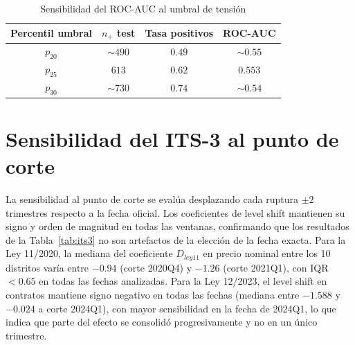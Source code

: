\documentclass[12pt,a4paper]{article}
\begin{document}
\begin{table}[H]
\caption{Sensibilidad del ROC-AUC al umbral de tensión}
\label{tab:umbral}
\centering
\small
\begin{tabular}{cccc}
\toprule
Percentil umbral & $n_{+}$ test & Tasa positivos & ROC-AUC \\
\midrule
$p_{20}$ & $\sim 490$ & $0.49$ & $\sim 0.55$ \\
$p_{25}$ & $613$      & $0.62$ & $0.553$      \\
$p_{30}$ & $\sim 730$ & $0.74$ & $\sim 0.54$ \\
\bottomrule
\end{tabular}
\end{table}

\section{Sensibilidad del ITS-3 al punto de corte}
\label{app:its_robustez}

La sensibilidad al punto de corte se evalúa desplazando cada ruptura $\pm 2$
trimestres respecto a la fecha oficial. Los coeficientes de level shift mantienen
su signo y orden de magnitud en todas las ventanas, confirmando que los resultados
de la Tabla~\ref{tab:its3} no son artefactos de la elección de la fecha exacta.
Para la Ley 11/2020, la mediana del coeficiente $D_{ley11}$ en precio nominal entre
los 10 distritos varía entre $-0.94$ (corte 2020Q4) y $-1.26$ (corte 2021Q1), con
IQR $< 0.65$ en todas las fechas analizadas. Para la Ley 12/2023, el level shift
en contratos mantiene signo negativo en todas las fechas (mediana entre $-1.588$ y
$-0.024$ a corte 2024Q1), con mayor sensibilidad en la fecha de 2024Q1, lo que
indica que parte del efecto se consolidó progresivamente y no en un único trimestre.
\end{document}
